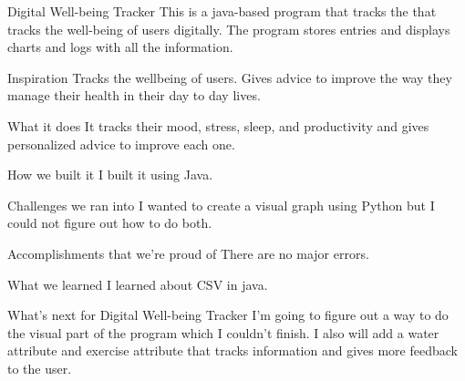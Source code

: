 Digital Well-being Tracker
This is a java-based program that tracks the that tracks the well-being of users digitally. The program stores entries and displays charts and logs with all the information.

Inspiration
Tracks the wellbeing of users. Gives advice to improve the way they manage their health in their day to day lives.

What it does
It tracks their mood, stress, sleep, and productivity and gives personalized advice to improve each one.

How we built it
I built it using Java.

Challenges we ran into
I wanted to create a visual graph using Python but I could not figure out how to do both.

Accomplishments that we're proud of
There are no major errors.

What we learned
I learned about CSV in java.

What's next for Digital Well-being Tracker
I'm going to figure out a way to do the visual part of the program which I couldn't finish. I also will add a water attribute and exercise attribute that tracks information and gives more feedback to the user.
